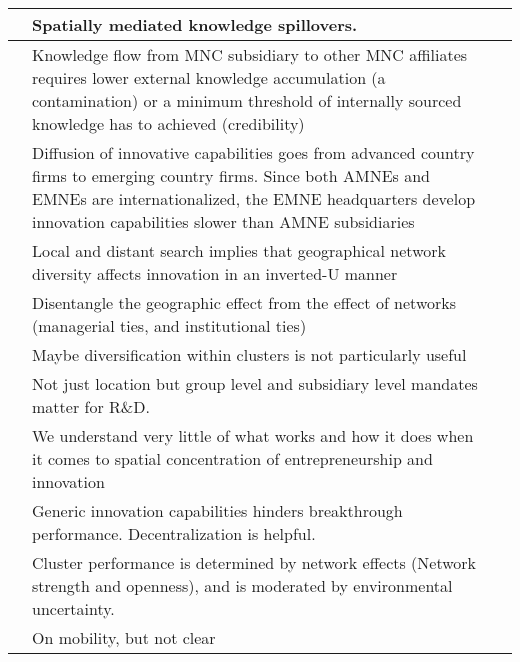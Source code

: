 \documentclass[12pt]{article}
\begin{document}
\begin{center}
\begin{longtable}{|p{}|p{}|p{}|}
\cite{Jaffe1989} &Spatially mediated knowledge spillovers.&\\\hline


\cite{Asmusses2011} & Knowledge flow from MNC subsidiary to other MNC affiliates requires lower external knowledge accumulation (a contamination) or a minimum threshold of internally sourced knowledge has to achieved (credibility)&\\\hline

\cite{Awate2015} & Diffusion of innovative capabilities goes from advanced country firms to emerging country firms. Since both AMNEs and EMNEs are internationalized, the EMNE headquarters develop innovation capabilities slower than AMNE subsidiaries&\\\hline

\cite{Bahlman2014} & Local and distant search implies that geographical network diversity affects innovation in an inverted-U manner&\\\hline

\cite{Bell2005} & Disentangle the geographic effect from the effect of networks (managerial ties, and institutional ties)&\\\hline

\cite{Baptista1998} & Maybe diversification within clusters is not particularly useful&\\\hline

\cite{Cantwell2005} & Not just location but group level and subsidiary level mandates matter for R\&D.&\\\hline

\cite{Chatterji2013} & We understand very little of what works and how it does when it comes to spatial concentration of entrepreneurship and innovation&\\\hline

\cite{Dunlap-Hinkler2010} & Generic innovation capabilities hinders breakthrough performance. Decentralization is helpful.&\\\hline

\cite{Eisengerich2010} & Cluster performance is determined by network effects (Network strength and openness), and is moderated by environmental uncertainty.&\\\hline

\cite{Eriksson2011} & On mobility, but not clear&\\\hline


\end{longtable}
\end{center}
\end{document}
